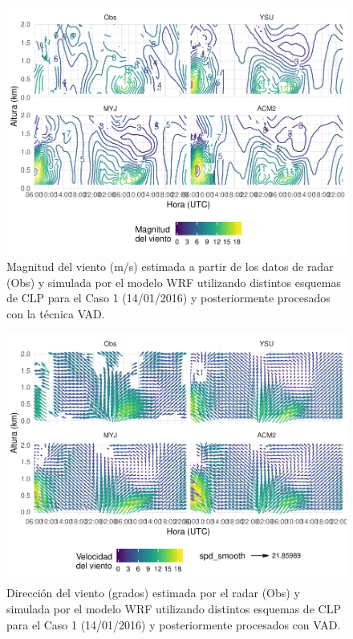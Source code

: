 \documentclass[12pt,spanish,oneside, a4paper]{book}
\begin{document}
\begin{figure}

{\centering \includegraphics{00_Paper_files/figure-latex/vad-modelo-spd-1} 

}

\caption{Magnitud del viento (m/s) estimada a partir de los datos de radar (Obs) y simulada por el modelo WRF utilizando distintos esquemas de CLP para el Caso 1 (14/01/2016) y posteriormente procesados con la técnica VAD. \label{modelo-spd}}\label{fig:vad-modelo-spd}
\end{figure}

\begin{figure}

{\centering \includegraphics{00_Paper_files/figure-latex/vad-modelo-dir-1} 

}

\caption{Dirección del viento (grados) estimada por el radar (Obs) y simulada por el modelo WRF utilizando distintos esquemas de CLP para el Caso 1 (14/01/2016) y posteriormente procesados con VAD. \label{modelo-dir}}\label{fig:vad-modelo-dir}
\end{figure}
\end{document}
